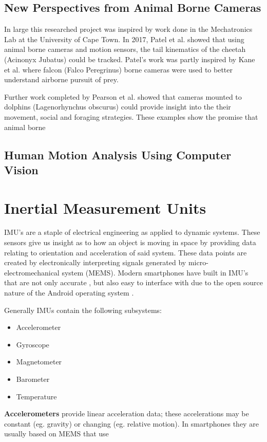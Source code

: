 \subsection{New Perspectives from Animal Borne Cameras}
In large this researched project was inspired by work done in the Mechatronics Lab at the University of Cape Town. In 2017, Patel et al.  \cite{patel2017trackingieee} showed that using animal borne cameras and motion sensors, the tail kinematics of the cheetah (Acinonyx Jubatus) could be tracked. Patel's work was partly inspired by Kane et al. \cite{kane2014falcons} where falcon (Falco Peregrinus) borne cameras were used to better understand airborne pursuit of prey.

Further work completed by Pearson et al. \cite{pearson2017testing} showed that cameras mounted to dolphins (Lagenorhynchus obscurus) could provide insight into the their movement, social and foraging strategies. These examples show the promise that animal borne 

\subsection{Human Motion Analysis Using Computer Vision}


\section{Inertial Measurement Units}
IMU's are a staple of electrical engineering as applied to dynamic systems. These sensors give us insight as to how an object is moving in space by providing data relating to orientation and acceleration of said system. These data points are created by electronically interpreting signals generated by micro-electromechanical system (MEMS). Modern smartphones have built in IMU's that are not only accurate \cite{gikas2016rigorous}, but also easy to interface with due to the open source nature of the Android operating system \cite{androidSensorLib}.  

Generally IMUs contain the following subsystems:
\begin{itemize}
\item Accelerometer
\item Gyroscope
\item Magnetometer
\item Barometer
\item Temperature
\end{itemize}

\textbf{Accelerometers} provide linear acceleration data; these accelerations may be constant (eg. gravity) or changing (eg. relative motion). In smartphones they are usually based on MEMS that use  

